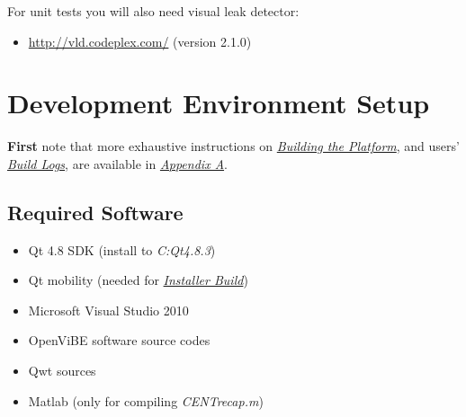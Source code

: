 \documentclass[letterpaper,10pt,english]{sphinxmanual}
\begin{document}
For unit tests you will also need visual leak detector:
\begin{itemize}
\item {} 
\href{http://vld.codeplex.com/}{http://vld.codeplex.com/} (version 2.1.0)

\end{itemize}


\section{\textbf{Development Environment Setup}}
\label{index:development-environment-setup}\label{index:dev-env-setup}
\textbf{First} note that more exhaustive instructions on {\hyperref[index:build-plat]{\emph{Building the Platform}}}, and users' {\hyperref[index:build-log]{\emph{Build Logs}}}, are available in {\hyperref[index:appendix-a]{\emph{Appendix A}}}.


\subsection{\textbf{Required Software}}
\label{index:req-soft}\label{index:required-software}\begin{itemize}
\item {} 
Qt 4.8 SDK (install to \emph{C:Qt4.8.3})

\item {} 
Qt mobility (needed for {\hyperref[index:installer-build]{\emph{Installer Build}}})

\item {} 
Microsoft Visual Studio 2010

\item {} 
OpenViBE software source codes

\item {} 
Qwt sources

\item {} 
Matlab (only for compiling \emph{CENTrecap.m})

\end{itemize}
\end{document}

